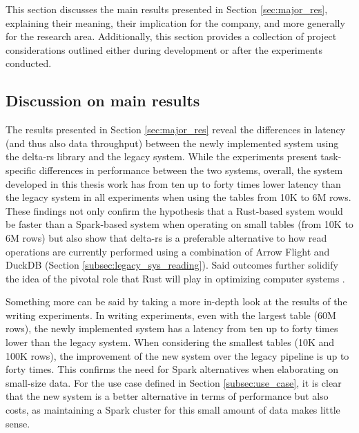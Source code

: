 This section discusses the main results presented in Section \ref{sec:major_res}, explaining their meaning, their implication for the company, and more generally for the research area. Additionally, this section provides a collection of project considerations outlined either during development or after the experiments conducted.

\subsection{Discussion on main results}

The results presented in Section \ref{sec:major_res} reveal the differences in latency (and thus also data throughput) between the newly implemented system using the delta-rs library and the legacy system. While the experiments present task-specific differences in performance between the two systems, overall, the system developed in this thesis work has from ten up to forty times lower latency than the legacy system in all experiments when using the tables from 10K to 6M rows. These findings not only confirm the hypothesis that a Rust-based system would be faster than a Spark-based system when operating on small tables (from 10K to 6M rows) but also show that delta-rs is a preferable alternative to how read operations are currently performed using a combination of Arrow Flight and DuckDB (Section \ref{subsec:legacy_sys_reading}). Said outcomes further solidify the idea of the pivotal role that Rust will play in optimizing computer systems \cite{Balasub2017}.

Something more can be said by taking a more in-depth look at the results of the writing experiments. In writing experiments, even with the largest table (60M rows), the newly implemented system has a latency from ten up to forty times lower than the legacy system. When considering the smallest tables (10K and 100K rows), the improvement of the new system over the legacy pipeline is up to forty times. This confirms the need for Spark alternatives when elaborating on small-size data. For the use case defined in Section \ref{subsec:use_case}, it is clear that the new system is a better alternative in terms of performance but also costs, as maintaining a Spark cluster for this small amount of data makes little sense. 

